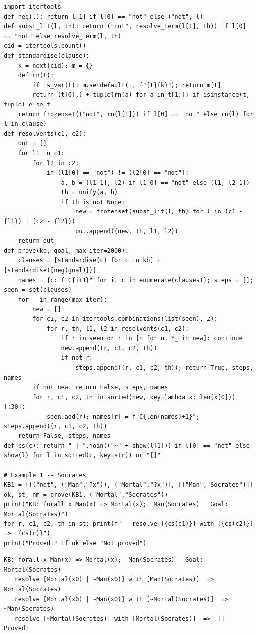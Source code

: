 \documentclass[11pt]{article}
\begin{document}
\begin{lstlisting}[style=py]
import itertools
def neg(l): return l[1] if l[0] == "not" else ("not", l)
def subst_lit(l, th): return ("not", resolve_term(l[1], th)) if l[0] == "not" else resolve_term(l, th)
cid = itertools.count()
def standardise(clause):
    k = next(cid); m = {}
    def rn(t):
        if is_var(t): m.setdefault(t, f"{t}{k}"); return m[t]
        return (t[0],) + tuple(rn(a) for a in t[1:]) if isinstance(t, tuple) else t
    return frozenset(("not", rn(l[1])) if l[0] == "not" else rn(l) for l in clause)
def resolvents(c1, c2):
    out = []
    for l1 in c1:
        for l2 in c2:
            if (l1[0] == "not") != (l2[0] == "not"):
                a, b = (l1[1], l2) if l1[0] == "not" else (l1, l2[1])
                th = unify(a, b)
                if th is not None:
                    new = frozenset(subst_lit(l, th) for l in (c1 - {l1}) | (c2 - {l2}))
                    out.append((new, th, l1, l2))
    return out
def prove(kb, goal, max_iter=2000):
    clauses = [standardise(c) for c in kb] + [standardise([neg(goal)])]
    names = {c: f"C{i+1}" for i, c in enumerate(clauses)}; steps = []; seen = set(clauses)
    for _ in range(max_iter):
        new = []
        for c1, c2 in itertools.combinations(list(seen), 2):
            for r, th, l1, l2 in resolvents(c1, c2):
                if r in seen or r in [n for n, *_ in new]: continue
                new.append((r, c1, c2, th))
                if not r:
                    steps.append((r, c1, c2, th)); return True, steps, names
        if not new: return False, steps, names
        for r, c1, c2, th in sorted(new, key=lambda x: len(x[0]))[:30]:
            seen.add(r); names[r] = f"C{len(names)+1}"; steps.append((r, c1, c2, th))
    return False, steps, names
def cs(c): return " | ".join(("~" + show(l[1])) if l[0] == "not" else show(l) for l in sorted(c, key=str)) or "[]"

# Example 1 -- Socrates
KB1 = [[("not", ("Man","?x")), ("Mortal","?x")], [("Man","Socrates")]]
ok, st, nm = prove(KB1, ("Mortal","Socrates"))
print("KB: forall x Man(x) => Mortal(x);  Man(Socrates)   Goal: Mortal(Socrates)")
for r, c1, c2, th in st: print(f"   resolve [{cs(c1)}] with [{cs(c2)}]  =>  {cs(r)}")
print("Proved!" if ok else "Not proved")
\end{lstlisting}
\begin{lstlisting}[style=out]
KB: forall x Man(x) => Mortal(x);  Man(Socrates)   Goal: Mortal(Socrates)
   resolve [Mortal(x0) | ~Man(x0)] with [Man(Socrates)]  =>  Mortal(Socrates)
   resolve [Mortal(x0) | ~Man(x0)] with [~Mortal(Socrates)]  =>  ~Man(Socrates)
   resolve [~Mortal(Socrates)] with [Mortal(Socrates)]  =>  []
Proved!
\end{lstlisting}
\end{document}
